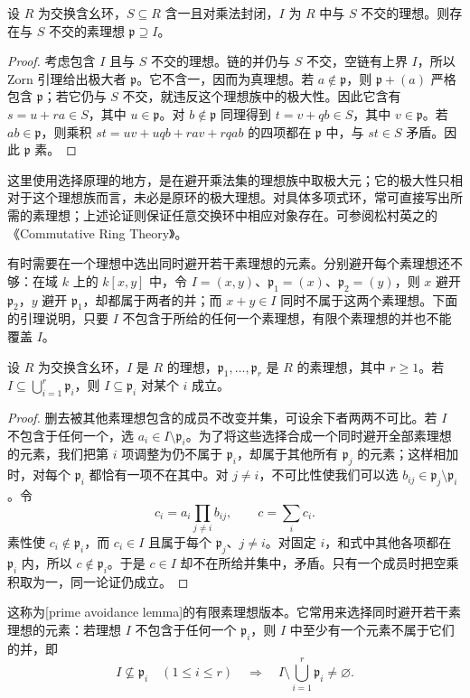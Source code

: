 \begin{lemma}[避开乘法集]\label{b3:lem:prime-disjoint-multiplicative}
	设 \(R\) 为交换含幺环，\(S\subseteq R\) 含一且对乘法封闭，\(I\) 为 \(R\) 中与 \(S\) 不交的理想。则存在与 \(S\) 不交的素理想 \(\mathfrak p\supseteq I\)。
\end{lemma}
\begin{proof}
	考虑包含 \(I\) 且与 \(S\) 不交的理想。链的并仍与 \(S\) 不交，空链有上界 \(I\)，所以 Zorn 引理给出极大者 \(\mathfrak p\)。它不含一，因而为真理想。若 \(a\notin\mathfrak p\)，则 \(\mathfrak p+(a)\) 严格包含 \(\mathfrak p\)；若它仍与 \(S\) 不交，就违反这个理想族中的极大性。因此它含有 \(s=u+ra\in S\)，其中 \(u\in\mathfrak p\)。对 \(b\notin\mathfrak p\) 同理得到 \(t=v+qb\in S\)，其中 \(v\in\mathfrak p\)。若 \(ab\in\mathfrak p\)，则乘积 \(st=uv+uqb+rav+rqab\) 的四项都在 \(\mathfrak p\) 中，与 \(st\in S\) 矛盾。因此 \(\mathfrak p\) 素。
\end{proof}

这里使用选择原理的地方，是在避开乘法集的理想族中取极大元；它的极大性只相对于这个理想族而言，未必是原环的极大理想。对具体多项式环，常可直接写出所需的素理想；上述论证则保证任意交换环中相应对象存在。可参阅松村英之的《Commutative Ring Theory》\cite[Theorems 1.1--1.2, pp. 2--3]{Matsumura1989CommutativeRingTheory}。

\ProseParagraphBreak
有时需要在一个理想中选出同时避开若干素理想的元素。分别避开每个素理想还不够：在域 \(k\) 上的 \(k[x,y]\) 中，令 \(I=(x,y)\)、\(\mathfrak p_1=(x)\)、\(\mathfrak p_2=(y)\)，则 \(x\) 避开 \(\mathfrak p_2\)，\(y\) 避开 \(\mathfrak p_1\)，却都属于两者的并；而 \(x+y\in I\) 同时不属于这两个素理想。下面的引理说明，只要 \(I\) 不包含于所给的任何一个素理想，有限个素理想的并也不能覆盖 \(I\)。

\begin{lemma}[有限素理想回避]\label{b3:lem:finite-prime-avoidance}
	设 \(R\) 为交换含幺环，\(I\) 是 \(R\) 的理想，\(\mathfrak p_1,\ldots,\mathfrak p_r\) 是 \(R\) 的素理想，其中 \(r\ge1\)。若 \(I\subseteq\bigcup_{i=1}^r\mathfrak p_i\)，则 \(I\subseteq\mathfrak p_i\) 对某个 \(i\) 成立。
\end{lemma}
\begin{proof}
	删去被其他素理想包含的成员不改变并集，可设余下者两两不可比。若 \(I\) 不包含于任何一个，选 \(a_i\in I\setminus\mathfrak p_i\)。为了将这些选择合成一个同时避开全部素理想的元素，我们把第 \(i\) 项调整为仍不属于 \(\mathfrak p_i\)，却属于其他所有 \(\mathfrak p_j\) 的元素；这样相加时，对每个 \(\mathfrak p_i\) 都恰有一项不在其中。对 \(j\ne i\)，不可比性使我们可以选 \(b_{ij}\in\mathfrak p_j\setminus\mathfrak p_i\)。令
	\[
		c_i=a_i\prod_{j\ne i}b_{ij},\qquad c=\sum_i c_i.
	\]
	素性使 \(c_i\notin\mathfrak p_i\)，而 \(c_i\in I\) 且属于每个 \(\mathfrak p_j\)、\(j\ne i\)。对固定 \(i\)，和式中其他各项都在 \(\mathfrak p_i\) 内，所以 \(c\notin\mathfrak p_i\)。于是 \(c\in I\) 却不在所给并集中，矛盾。只有一个成员时把空乘积取为一，同一论证仍成立。
\end{proof}

这称为[prime avoidance lemma]的有限素理想版本。它常用来选择同时避开若干素理想的元素：若理想 \(I\) 不包含于任何一个 \(\mathfrak p_i\)，则 \(I\) 中至少有一个元素不属于它们的并，即
\[
	I\nsubseteq\mathfrak p_i\quad(1\le i\le r) \quad\Longrightarrow\quad I\setminus\bigcup_{i=1}^r\mathfrak p_i\ne\varnothing.
\]
